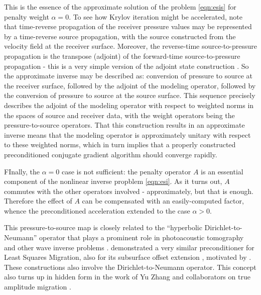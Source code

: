 \documentclass[georeport,12pt]{geophysics}
\begin{document}
This is the essence of the approximate solution of the problem
\ref{eqn:esis} for penalty weight $\alpha=0$. To see how Krylov
iteration might be accelerated, note that time-reverse propagation of
the receiver pressure values may be represented by a time-reverse
source propagation, with the source constructed from the velocity
field at the receiver surface. Moreover, the reverse-time
source-to-pressure propagation is the transpose (adjoint) of the
forward-time source-to-pressure propagation - this is a very simple
version of the adjoint state construction \cite[]{Plessix:06}. So the
approximate inverse may be described as: conversion of pressure to source at the
receiver surface, followed by the adjoint of the modeling operator,
followed by the conversion of pressure to source at the source
surface. This sequence precisely describes the adjoint of the modeling
operator with respect to weighted norms in the spaces of source and
receiver data, with the weight operators being the
pressure-to-source operators. That this construction results in an
approximate inverse means that the modeling operator is approximately
unitary with respect to these weighted norms, which in turn implies
that a properly constructed preconditioned conjugate gradient algorithm should converge
rapidly.

FInally, the $\alpha=0$ case is not sufficient: the penalty operator
$A$ is an essential component of the nonlinear inverse propblem
\ref{eqn:esi}. As it turns out, $A$ commutes with the other operators
involved - approximately, but that is enough. Therefore the effect of
$A$ can be compensated with an easily-computed factor, whence the
preconditioned acceleration extended to the case $\alpha > 0$. 

This pressure-to-source map is closely related to the ``hyperbolic
Dirichlet-to-Neumann'' operator that plays a prominent role in
photoacoustic tomography and other wave inverse problems
\cite[]{Rachele:00,StefUhl:05}. \cite{HouSymes:EAGE16} demonstrated a
very similar preconditioner for Least Squares Migration, also for its
subsurface offset extension \cite[]{HouSymes:16}, motivated by
\cite{tenKroode:12}. These constructions also involve the
Dirichlet-to-Neumann operator. This concept also turns up in hidden
form in the work of Yu Zhang and collaborators on true amplitude
migration
\cite[]{YuZhang:14,TangXuZhang:13,XuWang:2012,XuZhangTang:11,Zhang:SEG09}.



\end{document}
